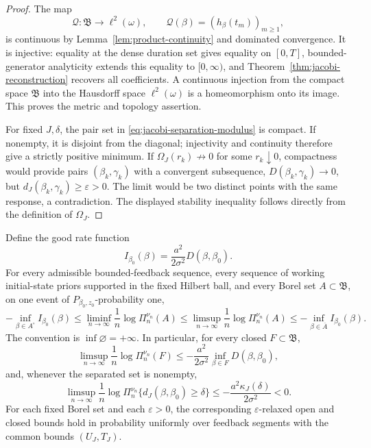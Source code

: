 \begin{proof}
The map
\[
 \mathcal Q:\mathfrak B\longrightarrow\ell^2(\omega),\qquad
 \mathcal Q(\beta)=(h_\beta(t_m))_{m\ge1},
\]
is continuous by Lemma~\ref{lem:product-continuity} and dominated
convergence.  It is injective: equality at the dense duration set gives
equality on \([0,T]\), bounded-generator analyticity extends this equality
to \([0,\infty)\), and Theorem~\ref{thm:jacobi-reconstruction} recovers all
coefficients.  A continuous injection from the compact space
\(\mathfrak B\) into the Hausdorff space \(\ell^2(\omega)\) is a
homeomorphism onto its image.  This proves the metric and topology assertion.

For fixed \(J,\delta\), the pair set in
\eqref{eq:jacobi-separation-modulus} is compact.  If nonempty, it is disjoint
from the diagonal; injectivity and continuity therefore give a strictly
positive minimum.  If \(\Omega_J(r_k)\not\to0\) for some \(r_k\downarrow0\),
compactness would provide pairs \((\beta_k,\gamma_k)\) with a convergent
subsequence, \(D(\beta_k,\gamma_k)\to0\), but
\(d_J(\beta_k,\gamma_k)\ge\varepsilon>0\).  The limit would be two distinct
points with the same response, a contradiction.  The displayed stability
inequality follows directly from the definition of \(\Omega_J\).
\end{proof}

\begin{theorem}
\label{thm:jacobi-rate}
Define the good rate function
\begin{equation}
 I_{\beta_0}(\beta)=\frac{a^2}{2\sigma^2}D(\beta,\beta_0).
 \label{eq:jacobi-rate-function}
\end{equation}
For every admissible bounded-feedback sequence, every sequence of working
initial-state priors supported in the fixed Hilbert ball, and every Borel set
\(A\subset\mathfrak B\), on one event of
\(P_{\beta_0,z_0}\)-probability one,
\begin{equation}
 -\inf_{\beta\in A^\circ}I_{\beta_0}(\beta)
 \le \liminf_{n\to\infty}\frac1n\log\Pi_n^{\nu_n}(A)
 \le \limsup_{n\to\infty}\frac1n\log\Pi_n^{\nu_n}(A)
 \le-\inf_{\beta\in\overline A}I_{\beta_0}(\beta).
 \label{eq:jacobi-posterior-ldp}
\end{equation}
The convention is \(\inf\varnothing=+\infty\).  In particular, for every
closed \(F\subset\mathfrak B\),
\begin{equation}
 \limsup_{n\to\infty}\frac1n\log\Pi_n^{\nu_n}(F)
 \le-\frac{a^2}{2\sigma^2}
       \inf_{\beta\in F}D(\beta,\beta_0),
 \label{eq:jacobi-closed-set-rate}
\end{equation}
and, whenever the separated set is nonempty,
\begin{equation}
 \limsup_{n\to\infty}\frac1n
 \log\Pi_n^{\nu_n}\{d_J(\beta,\beta_0)\ge\delta\}
 \le-\frac{a^2\kappa_J(\delta)}{2\sigma^2}<0.
 \label{eq:jacobi-cylinder-rate}
\end{equation}
For each fixed Borel set and each \(\varepsilon>0\), the corresponding
\(\varepsilon\)-relaxed open and closed bounds hold in probability uniformly
over feedback segments with the common bounds \((U_J,T_J)\).
\end{theorem}

